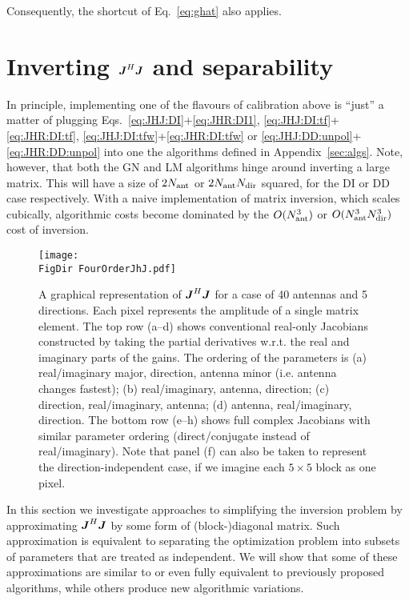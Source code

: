 \documentclass[useAMS,usenatbib]{mn2e}
\newcommand{\mat}[1]{{\bmath{#1}}}
\newcommand{\JJ}{\mat{J}} %
\newcommand{\JHJ}{\JJ^H\JJ} %
\newcommand{\FigDir}{../Figures/}
\begin{document}
Consequently, the shortcut of Eq.~\ref{eq:ghat} also applies.

\section{Inverting $\JJ^H\JJ$ and separability}
\label{sec:separability}

In principle, implementing one of the flavours of calibration above is ``just'' a matter of  
plugging Eqs.~\ref{eq:JHJ:DI}+\ref{eq:JHR:DI1}, \ref{eq:JHJ:DI:tf}+\ref{eq:JHR:DI:tf},
\ref{eq:JHJ:DI:tfw}+\ref{eq:JHR:DI:tfw} or \ref{eq:JHJ:DD:unpol}+\ref{eq:JHR:DD:unpol} into one the algorithms defined in 
Appendix~\ref{sec:algs}. Note, however, that both the GN and LM algorithms hinge around 
inverting a large matrix. This will have a size of $2N_\mathrm{ant}$ or $2N_\mathrm{ant}N_\mathrm{dir}$ squared, 
for the DI or DD case respectively. With a naive implementation of matrix inversion, 
which scales cubically, algorithmic costs become dominated by the $O(N_\mathrm{ant}^3)$ or $O(N_\mathrm{ant}^3N_\mathrm{dir}^3)$
cost of inversion.


\begin{figure*}
\begin{center}
\texttt{[image: \\FigDir FourOrderJhJ.pdf]}
\caption{\label{fig:JHJ}A graphical representation of $\JHJ$ for a case of 
40 antennas and 5 directions. Each pixel represents the amplitude of a single matrix element.
The top row (a--d) shows conventional real-only Jacobians constructed by taking the partial derivatives w.r.t. 
the real and imaginary parts of the gains. The ordering of the parameters is (a) real/imaginary major, 
direction, antenna minor (i.e. antenna changes fastest); (b) real/imaginary, antenna, direction; (c) direction, 
real/imaginary, antenna; (d) antenna, real/imaginary, direction. The bottom row (e--h) shows full complex Jacobians with similar parameter ordering (direct/conjugate instead of real/imaginary). Note that panel (f) can also be taken to represent the direction-independent case, if we imagine each $5\times5$ block as one pixel.}
\end{center}
\end{figure*}



In this section we investigate approaches to simplifying the inversion problem by approximating
$\JJ^H\JJ$ by some form of (block-)diagonal matrix. Such approximation is equivalent to separating
the optimization problem into subsets of parameters that are treated as independent. We will show 
that some of these approximations are similar to or even fully equivalent to previously proposed 
algorithms, while others produce new algorithmic variations.
\end{document}
